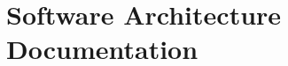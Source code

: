 \documentclass[a4paper]{article}
\begin{document}

\section{Software Architecture Documentation}
    
\end{document}
